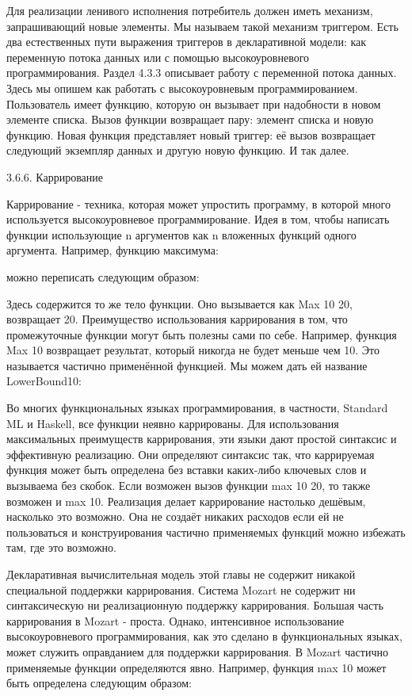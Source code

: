 Для реализации ленивого исполнения потребитель должен иметь механизм, запрашивающий новые элементы. Мы называем такой механизм триггером. Есть два естественных пути выражения триггеров в декларативной модели: как переменную потока данных или с помощью высокоуровневого программирования. Раздел 4.3.3 описывает работу с переменной потока данных. Здесь мы опишем как работать с высокоуровневым программированием. Пользователь имеет функцию, которую он вызывает при надобности в новом элементе списка. Вызов функции возвращает пару: элемент списка и новую функцию. Новая функция представляет новый триггер: её вызов возвращает следующий экземпляр данных и другую новую функцию. И так далее.

3.6.6. Каррирование

Каррирование - техника, которая может упростить программу, в которой много используется высокоуровневое программирование. Идея в том, чтобы написать функции использующие n аргументов как n вложенных функций одного аргумента. Например, функцию максимума:

можно переписать следующим образом:

Здесь содержится то же тело функции. Оно вызывается как {{Max 10} 20}, возвращает 20. Преимущество использования каррирования в том, что промежуточные функции могут быть полезны сами по себе. Например, функция {Max 10} возвращает результат, который никогда не будет меньше чем 10. Это называется частично применённой функцией. Мы можем дать ей название LowerBound10:

Во многих функциональных языках программирования, в частности, Standard ML и Haskell, все функции неявно каррированы. Для использования максимальных преимуществ каррирования, эти языки дают простой синтаксис и эффективную реализацию. Они определяют синтаксис так, что каррируемая функция может быть определена без вставки каких-либо ключевых слов и вызываема без скобок. Если возможен вызов функции max 10 20, то также возможен и max 10. Реализация делает каррирование настолько дешёвым, насколько это возможно. Она не создаёт никаких расходов если ей не пользоваться и конструирования частично применяемых функций можно избежать там, где это возможно.

Декларативная вычислительная модель этой главы не содержит никакой специальной поддержки каррирования. Система Mozart не содержит ни синтаксическую ни реализационную поддержку каррирования. Большая часть каррирования в Mozart - проста. Однако, интенсивное использование высокоуровневого программирования, как это сделано в функциональных языках, может служить оправданием для поддержки каррирования. В Mozart частично применяемые функции определяются явно. Например, функция max 10 может быть определена следующим образом:

